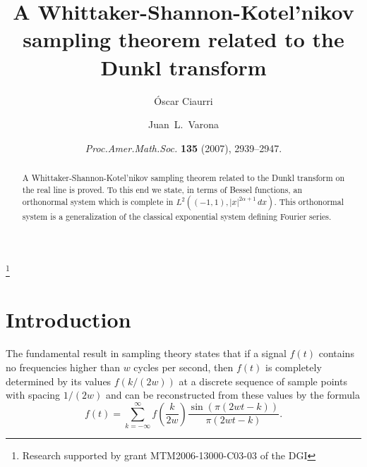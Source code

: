 \documentclass[11pt]{amsart}
\date{\textit{Proc.\@ Amer.\@ Math.\@ Soc.\@} \textbf{135} (2007), 2939--2947.}
\theoremstyle{plain}
\begin{document}

\title[A WSK sampling theorem related to the Dunkl transform]{A Whittaker-Shannon-Kotel'nikov sampling theorem related to the Dunkl transform}

\author[\'O. Ciaurri]{\'Oscar Ciaurri}
\address{Departamento de Matem\'aticas y Computaci\'on,
Universidad de La Rioja, Edificio J.~L.~Vives,
Calle Luis de Ulloa s/n, 26004 Logro\~no, Spain}

\author[J. L. Varona]{Juan~L.~Varona}
\address{Departamento de Matem\'aticas y Computaci\'on,
Universidad de La Rioja, Edificio J.~L.~Vives,
Calle Luis de Ulloa s/n, 26004 Logro\~no, Spain}
\thanks{Research supported by grant MTM2006-13000-C03-03 of the DGI}



\begin{abstract}
A Whittaker-Shannon-Kotel'nikov sampling theorem related to the
Dunkl transform on the real line is proved.
To this end we state, in terms of Bessel functions, an orthonormal system
which is complete in $L^2((-1,1), |x|^{2\alpha+1}\,dx)$.
This orthonormal system is a generalization of the classical
exponential system defining Fourier series.
\end{abstract}

\maketitle

\section{Introduction}

The fundamental result in sampling theory states that if a signal $f(t)$ contains no frequencies higher than $w$ cycles per second, then $f(t)$ is completely determined by its values $f(k/(2w))$ at a discrete sequence of sample points with
spacing $1/(2w)$ and can be reconstructed from these values by the formula
\begin{equation}
\label{eq:shannon}
  f(t) = \sum_{k = -\infty}^{\infty} f\left(\frac{k}{2w}\right)
  \frac{\sin(\pi(2wt-k))}{\pi(2wt-k)}.
\end{equation}
\end{document}
